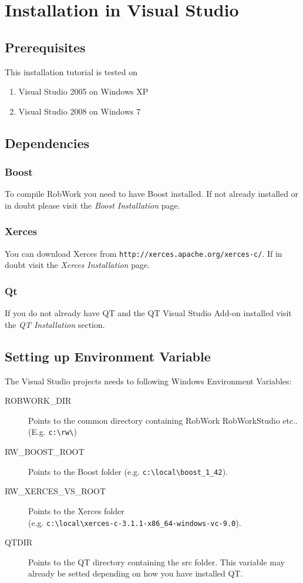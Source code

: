 \section{Installation in Visual Studio}
\subsection{Prerequisites}
This installation tutorial is tested on
\begin{enumerate}
\item Visual Studio 2005 on Windows XP
\item Visual Studio 2008 on Windows 7
\end{enumerate}

\subsection{Dependencies}
\subsubsection{Boost}
To compile RobWork you need to have Boost installed. If not already installed or in doubt please visit the \emph{Boost Installation} page.


\subsubsection{Xerces}
You can download Xerces from \lstinline{http://xerces.apache.org/xerces-c/}. If in doubt visit the \emph{Xerces Installation} page.

\subsubsection{Qt}
If you do not already have QT and the QT Visual Studio Add-on installed visit the \emph{QT Installation} section.


\subsection{Setting up Environment Variable}
The Visual Studio projects needs to following Windows Environment Variables:

\begin{description}
\item[ROBWORK\_DIR] Points to the common directory containing RobWork RobWorkStudio etc.. (E.g. \lstinline{c:\rw\})
\item[RW\_BOOST\_ROOT] Points to the Boost folder (e.g. \lstinline{c:\local\boost_1_42}).
\item[RW\_XERCES\_VS\_ROOT] Points to the Xerces folder \\
(e.g. \lstinline{c:\local\xerces-c-3.1.1-x86_64-windows-vc-9.0}).
\item[QTDIR] Points to the QT directory containing the src folder. This variable may already be setted depending on how you have installed QT.
\end{description}



